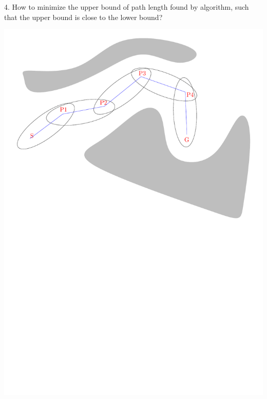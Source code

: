 \documentclass[12pt]{article}
\begin{document}
  4. How to minimize the upper bound of path length found by algorithm, such that the upper bound is close to the lower bound?
  
  \includegraphics[scale=0.6]{path}\\
  
  
\end{document}
